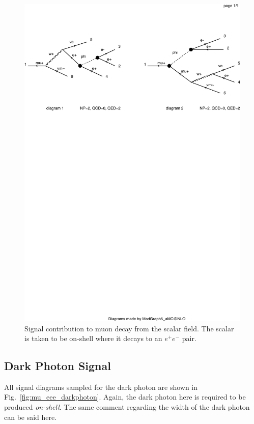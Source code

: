 \begin{figure}[h]
    \centering
    \includegraphics[width=\textwidth,clip=true,viewport=0 500 500 700]{Figures/madgraph_diagrams/mu_eeenunu_scalar.pdf}
    \caption{Signal contribution to muon decay from the scalar field. The scalar is taken to be on-shell where it decays to an $e^+ e^-$ pair.}
    \label{fig:mu_eee_scalar}
\end{figure}

\subsection{Dark Photon Signal}
All signal diagrams sampled for the dark photon are shown in Fig.\ \ref{fig:mu_eee_darkphoton}.
Again, the dark photon here is required to be produced \emph{on-shell}.
The same comment regarding the width of the dark photon can be said here.

